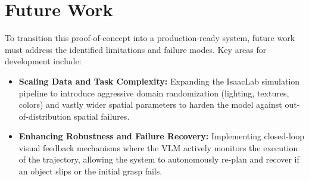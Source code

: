 \section{Future Work}
To transition this proof-of-concept into a production-ready system, future work must address the identified limitations and failure modes. Key areas for development include:
\begin{itemize}
    \item \textbf{Scaling Data and Task Complexity:} Expanding the IsaacLab simulation pipeline to introduce aggressive domain randomization (lighting, textures, colors) and vastly wider spatial parameters to harden the model against out-of-distribution spatial failures.
    \item \textbf{Enhancing Robustness and Failure Recovery:} Implementing closed-loop visual feedback mechanisms where the VLM actively monitors the execution of the trajectory, allowing the system to autonomously re-plan and recover if an object slips or the initial grasp fails.
\end{itemize}